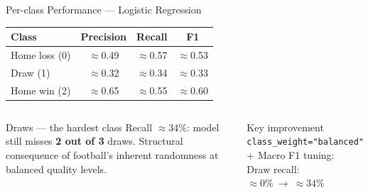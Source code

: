 \documentclass[10pt,aspectratio=169]{beamer}
\begin{document}
\begin{frame}{Per-class Performance --- Logistic Regression}
  \begin{center}
    \begin{tabular}{lccc}
      \toprule
      \textbf{Class} & \textbf{Precision} & \textbf{Recall} & \textbf{F1} \\
      \midrule
      Home loss (0) & $\approx$0.49 & $\approx$0.57 & $\approx$0.53 \\
      \rowcolor{LightBlue}
      Draw (1) & $\approx$0.32 & $\approx$0.34 & $\approx$0.33 \\
      Home win (2) & $\approx$0.65 & $\approx$0.55 & $\approx$0.60 \\
      \bottomrule
    \end{tabular}
  \end{center}

  \medskip
  \begin{columns}[T]
      \begin{alertblock}{Draws --- the hardest class}
        Recall $\approx 34\%$: model still misses \textbf{2 out of 3} draws.
        Structural consequence of football's inherent randomness at balanced
        quality levels.
      \end{alertblock}
      \begin{block}{Key improvement}
        \texttt{class\_weight="balanced"} + Macro F1 tuning: \\[4pt]
        \centering
        Draw recall: $\approx 0\%\ \longrightarrow\ \approx 34\%$
      \end{block}
  \end{columns}
\end{frame}
\end{document}
